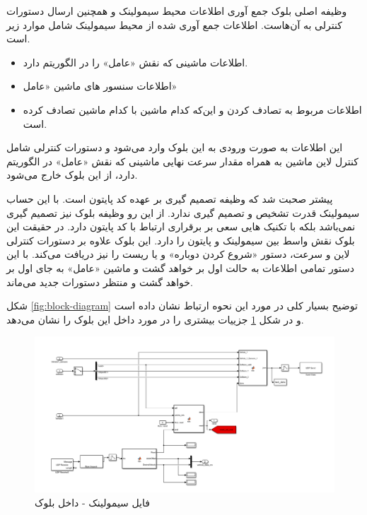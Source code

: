 وظیفه اصلی بلوک 
جمع آوری اطلاعات محیط سیمولینک و همچنین ارسال دستورات کنترلی به آن‌هاست. اطلاعات جمع آوری شده از محیط سیمولینک شامل موارد زیر است.

\begin{itemize}
	\item 
	اطلاعات ماشینی که نقش «عامل» را در الگوریتم دارد.
	\item 
	اطلاعات سنسور های ماشین «عامل»
	\item 
	اطلاعات مربوط به تصادف کردن و این‌که کدام ماشین با کدام ماشین تصادف کرده است.	
\end{itemize}

این اطلاعات به صورت ورودی به این بلوک وارد می‌شود و دستورات کنترلی شامل کنترل لاین ماشین به همراه مقدار سرعت نهایی ماشینی که نقش «عامل» در الگوریتم دارد، از این بلوک خارج می‌شود.

پیشتر صحبت شد که وظیفه تصمیم گیری بر عهده کد پایتون است. با این حساب سیمولینک قدرت تشخیص و تصمیم گیری ندارد. از این رو وظیفه بلوک 
نیز تصمیم گیری نمی‌باشد بلکه با تکنیک هایی سعی بر برقراری ارتباط با کد پایتون دارد. در حقیقت این بلوک نقش واسط بین سیمولینک و پایتون را دارد. این بلوک علاوه بر دستورات کنترلی لاین و سرعت، دستور «شروع کردن دوباره» و یا ریست را نیز دریافت می‌کند. با این دستور تمامی اطلاعات به حالت اول بر خواهد گشت و ماشین «عامل» به جای اول بر خواهد گشت و منتظر دستورات جدید می‌ماند.

شکل 
\ref{fig:block-diagram}
توضیح بسیار کلی  در مورد این نحوه ارتباط نشان داده است و در شکل 
\ref{fig:inside-environment}
جزییات بیشتری را در مورد داخل این بلوک را نشان می‌دهد.


\begin{figure}
	\centering
	\includegraphics[width=0.95\linewidth]{Figures/simulink/inside-Environment}
	\caption{فایل سیمولینک - داخل بلوک }
	\label{fig:inside-environment}
\end{figure}

